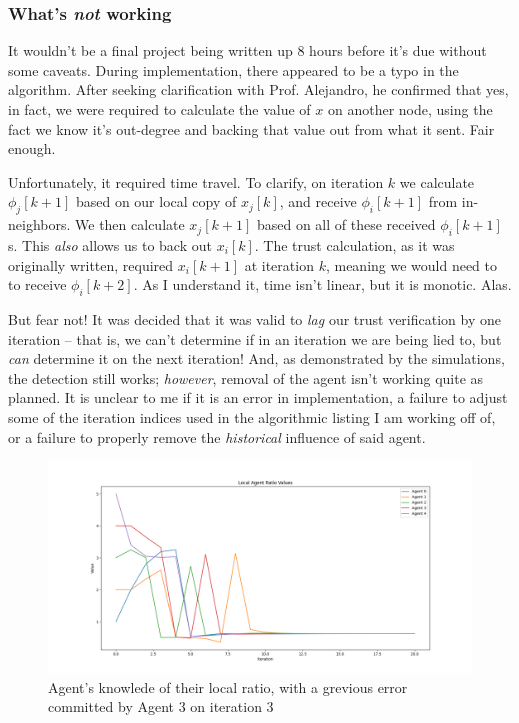 \documentclass[11pt]{article}
\begin{document}
\subsubsection*{What's \textit{not} working}
It wouldn't be a final project being written up 8 hours before it's due without some
caveats. During implementation, there appeared to be a typo in the algorithm.
After seeking clarification with Prof. Alejandro, he confirmed that yes, in fact,
we were required to calculate the value of $x$ on another node, using the
fact we know it's out-degree and backing that value out from what it sent. Fair enough.

Unfortunately, it required time travel. To clarify, on iteration $k$ we
calculate  $\phi_j[k+1]$ based on our local copy of $x_j[k]$, and receive
$\phi_i[k+1]$ from in-neighbors. We then calculate $x_j[k+1]$ based on all of
these received $\phi_i[k+1]$s.  This \textit{also} allows us to back out
$x_i[k]$. The trust calculation, as it was originally written, required
$x_i[k+1]$ at iteration $k$, meaning we would need to to receive $\phi_i[k+2]$.
As I understand it, time isn't linear, but it is monotic. Alas.

But fear not! It was decided that it was valid to \textit{lag} our trust
verification by one iteration -- that is, we can't determine if in an iteration
we are being lied to, but \textit{can} determine it on the next iteration! And,
as demonstrated by the simulations, the detection still works; \textit{however},
removal of the agent isn't working quite as planned. It is unclear to me if it
is an error in implementation, a failure to adjust some of the iteration indices
used in the algorithmic listing I am working off of, or a failure to properly
remove the  \textit{historical} influence of said agent.

\begin{figure}[h!]
    \centering
    \includegraphics[width=\textwidth]{img/error_centralized_ratios.png}
    \caption{Agent's knowlede of their local ratio, with a grevious error
        committed by Agent 3 on iteration 3}
    \label{fig:central_bad}
\end{figure}
\end{document}

